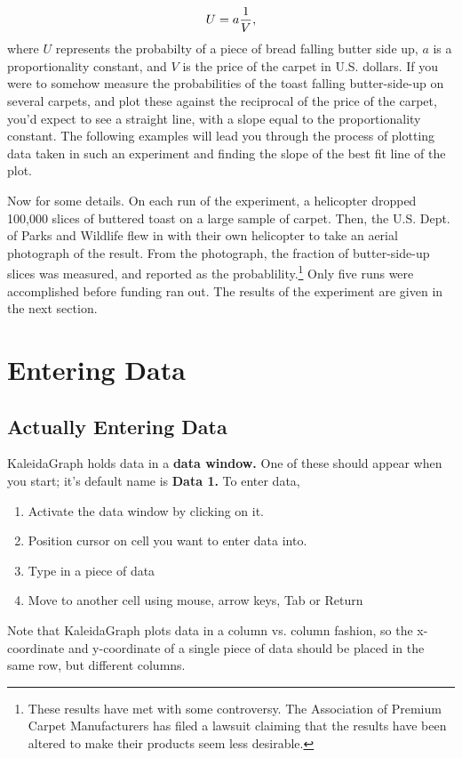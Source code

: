 \documentclass[12pt]{article}
\begin{document}
$$ U = a{1 \over V}, $$
where $U$ represents the probabilty of a piece of bread falling butter side up, $a$ is a
proportionality constant, and $V$ is the price of the carpet in U.S. dollars. If you
were to somehow measure the probabilities of the toast falling butter-side-up on several
carpets, and plot these against the reciprocal of the price of the carpet, you'd
expect to see a straight line, with a slope equal to the proportionality constant.
The following examples will lead you through the process of plotting data taken in such an experiment and finding the slope of the best fit line of the plot.

Now for some details. On each run of the experiment, a helicopter dropped 100,000 slices
of buttered toast on a large sample of carpet. Then, the U.S. Dept. of Parks and
Wildlife flew in with their own helicopter to take an aerial photograph of the
result. From the photograph, the fraction of butter-side-up slices was measured, and
reported as the probablility.\footnote{These results have met with some controversy. The Association of Premium Carpet Manufacturers has filed a lawsuit claiming that the results have been altered to make their products seem less desirable.} Only five runs were accomplished before funding ran
out. The results of the experiment are given in the next section.

\section {Entering Data}
\subsection {Actually Entering Data}

KaleidaGraph holds data in a {\bf data window.} One of these should appear when you
start; it's default name is {\bf Data 1.} To enter data,

\noindent
\begin{enumerate}
\item Activate the data window by clicking on it.
\item Position cursor on cell you want to enter data into.
\item Type in a piece of data
\item Move to another cell using mouse, arrow keys, Tab or Return
\end{enumerate}
\indent

Note that KaleidaGraph plots data in a column vs. column fashion, so the
x-coordinate and y-coordinate of a single piece of data should be placed in the same
row, but different columns.
\end{document}
